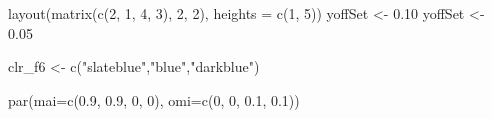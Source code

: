 \documentclass[
  11pt,
]{article}
\newenvironment{Shaded}{}{}
\newcommand{\AttributeTok}[1]{#1}
\newcommand{\DecValTok}[1]{#1}
\newcommand{\FloatTok}[1]{#1}
\newcommand{\FunctionTok}[1]{#1}
\newcommand{\NormalTok}[1]{#1}
\newcommand{\OtherTok}[1]{\textcolor[rgb]{1.00,0.25,0.00}{#1}}
\newcommand{\StringTok}[1]{\textcolor[rgb]{0.00,0.50,0.50}{#1}}
\begin{document}
\begin{Shaded}
\begin{Highlighting}[]
\FunctionTok{layout}\NormalTok{(}\FunctionTok{matrix}\NormalTok{(}\FunctionTok{c}\NormalTok{(}\DecValTok{2}\NormalTok{, }\DecValTok{1}\NormalTok{, }\DecValTok{4}\NormalTok{, }\DecValTok{3}\NormalTok{), }\DecValTok{2}\NormalTok{, }\DecValTok{2}\NormalTok{), }\AttributeTok{heights =} \FunctionTok{c}\NormalTok{(}\DecValTok{1}\NormalTok{, }\DecValTok{5}\NormalTok{))}
\NormalTok{yoffSet }\OtherTok{\textless{}{-}} \FloatTok{0.10}
\NormalTok{yoffSet }\OtherTok{\textless{}{-}} \FloatTok{0.05}

\NormalTok{clr\_f6 }\OtherTok{\textless{}{-}} \FunctionTok{c}\NormalTok{(}\StringTok{"slateblue"}\NormalTok{,}\StringTok{"blue"}\NormalTok{,}\StringTok{"darkblue"}\NormalTok{)}

\FunctionTok{par}\NormalTok{(}\AttributeTok{mai=}\FunctionTok{c}\NormalTok{(}\FloatTok{0.9}\NormalTok{, }\FloatTok{0.9}\NormalTok{, }\DecValTok{0}\NormalTok{, }\DecValTok{0}\NormalTok{), }\AttributeTok{omi=}\FunctionTok{c}\NormalTok{(}\DecValTok{0}\NormalTok{, }\DecValTok{0}\NormalTok{, }\FloatTok{0.1}\NormalTok{, }\FloatTok{0.1}\NormalTok{))}


\end{Highlighting}
\end{Shaded}
\end{document}
